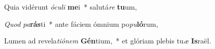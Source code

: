 \item Quia vidérunt \textit{ó}\textit{cu}\textit{li} \textbf{me}i~* salutá\textit{re} \textbf{tu}um,
\item \textit{Quod} \textit{pa}\textbf{rás}ti~* ante fáciem ómnium po\textit{pu}\textbf{ló}rum,
\item Lumen ad revela\textit{ti}\textit{ó}\textit{nem} \textbf{Gén}tium,~* et glóriam plebis tu\textit{æ} \textbf{Is}raël.
